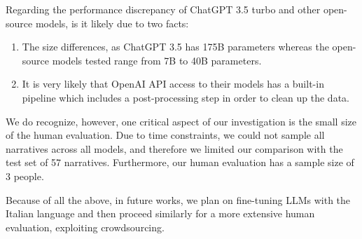 Regarding the performance discrepancy of ChatGPT 3.5 turbo and other open-source models, is it likely due to two facts:
\begin{enumerate}
    \item The size differences, as ChatGPT 3.5 has 175B parameters \cite{chatgpt-parameters} whereas the open-source models tested range from 7B to 40B parameters.
    \item It is very likely that OpenAI API access to their models has a built-in pipeline which includes a post-processing step in order to clean up the data.
\end{enumerate}

We do recognize, however, one critical aspect of our investigation is the small size of the human evaluation. Due to time constraints, we could not sample all narratives across all models, and therefore we limited our comparison with the test set of 57 narratives. Furthermore, our human evaluation has a sample size of 3 people. 

Because of all the above, in future works, we plan on fine-tuning LLMs with the Italian language and then proceed similarly for a more extensive human evaluation, exploiting crowdsourcing. 